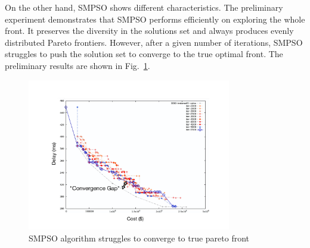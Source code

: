 \documentclass[10pt,journal,compsoc]{IEEEtran}
\newcommand{\Fig}[1]{Fig.~\ref{#1}}
\begin{document}
On the other hand, SMPSO shows different characteristics. The preliminary experiment demonstrates that SMPSO performs efficiently on exploring the whole front. It preserves the diversity in the solutions set and always produces evenly distributed Pareto frontiers. However, after a given number of iterations, SMPSO struggles to push the solution set to converge to the true optimal front. 
The preliminary results are shown in \Fig{smpsolabel}.
\begin{figure}[H]
\centerline{\includegraphics[page=1,width=3.5in]{SMPSO_iterationtest_label.pdf}}
\caption{SMPSO algorithm struggles to converge to true pareto front} 
\label{smpsolabel}
\end{figure}
\end{document}
